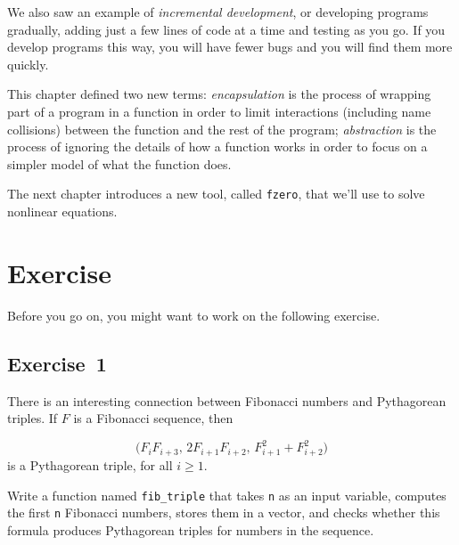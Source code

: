 We also saw an example of \emph{incremental development}, or developing programs gradually, adding just a few lines of code at a time and testing as you go.  If you develop programs this way, you will have fewer bugs and you will find them more quickly.

This chapter defined two new terms: \emph{encapsulation} is the process of wrapping part of a program in
a function in order to limit interactions (including name collisions)
between the function and the rest of the program; \emph{abstraction} is the process of ignoring the details of how a function works in order to focus on a simpler model of what the
function does.

The next chapter introduces a new tool, called \lstinline{fzero}, that we'll use to solve nonlinear equations.


\section{Exercise}

Before you go on, you might want to work on the following exercise.

\subsection{Exercise~1}

There is an interesting connection between Fibonacci numbers and
Pythagorean triples.  If $F$ is a Fibonacci sequence, then

\begin{equation*}
\big(F_i F_{i+3}, \, 2 F_{i+1} F_{i+2}, \, F_{i+1}^2 + F_{i+2}^2 \big)
\end{equation*}
is a Pythagorean triple, for all $i \ge 1$.

Write a function named \lstinline{fib_triple} that
takes \lstinline{n} as an input variable, computes 
the first \lstinline{n} Fibonacci numbers, stores them in a vector,
and checks whether this formula produces Pythagorean triples for numbers in the \mbox{sequence}.





